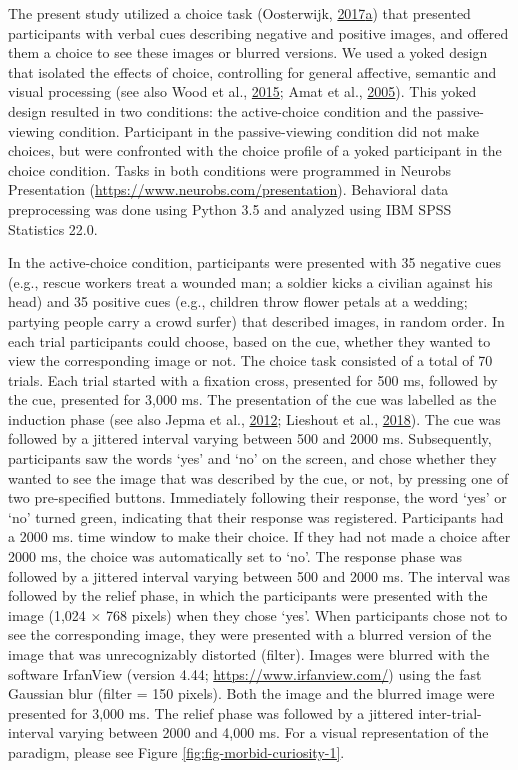 \documentclass[12pt,american,a4paper,oneside,]{memoir} %
\begin{document}
The present study utilized a choice task (Oosterwijk, \protect\hyperlink{ref-oosterwijk2017choosing}{2017}\protect\hyperlink{ref-oosterwijk2017choosing}{a}) that presented participants with verbal cues describing negative and positive images, and offered them a choice to see these images or blurred versions. We used a yoked design that isolated the effects of choice, controlling for general affective, semantic and visual processing (see also Wood et al., \protect\hyperlink{ref-wood2015controllability}{2015}; Amat et al., \protect\hyperlink{ref-amat2005medial}{2005}). This yoked design resulted in two conditions: the active-choice condition and the passive-viewing condition. Participant in the passive-viewing condition did not make choices, but were confronted with the choice profile of a yoked participant in the choice condition. Tasks in both conditions were programmed in Neurobs Presentation (\url{https://www.neurobs.com/presentation}). Behavioral data preprocessing was done using Python 3.5 and analyzed using IBM SPSS Statistics 22.0.

In the active-choice condition, participants were presented with 35 negative cues (e.g., rescue workers treat a wounded man; a soldier kicks a civilian against his head) and 35 positive cues (e.g., children throw flower petals at a wedding; partying people carry a crowd surfer) that described images, in random order. In each trial participants could choose, based on the cue, whether they wanted to view the corresponding image or not. The choice task consisted of a total of 70 trials. Each trial started with a fixation cross, presented for 500 ms, followed by the cue, presented for 3,000 ms. The presentation of the cue was labelled as the induction phase (see also Jepma et al., \protect\hyperlink{ref-jepma2012neural}{2012}; Lieshout et al., \protect\hyperlink{ref-van2018induction}{2018}). The cue was followed by a jittered interval varying between 500 and 2000 ms. Subsequently, participants saw the words `yes' and `no' on the screen, and chose whether they wanted to see the image that was described by the cue, or not, by pressing one of two pre-specified buttons. Immediately following their response, the word `yes' or `no' turned green, indicating that their response was registered. Participants had a 2000 ms. time window to make their choice. If they had not made a choice after 2000 ms, the choice was automatically set to `no'. The response phase was followed by a jittered interval varying between 500 and 2000 ms. The interval was followed by the relief phase, in which the participants were presented with the image (1,024 × 768 pixels) when they chose `yes'. When participants chose not to see the corresponding image, they were presented with a blurred version of the image that was unrecognizably distorted (filter). Images were blurred with the software IrfanView (version 4.44; \url{https://www.irfanview.com/}) using the fast Gaussian blur (filter = 150 pixels). Both the image and the blurred image were presented for 3,000 ms. The relief phase was followed by a jittered inter-trial-interval varying between 2000 and 4,000 ms. For a visual representation of the paradigm, please see Figure \ref{fig:fig-morbid-curiosity-1}.
\end{document}
